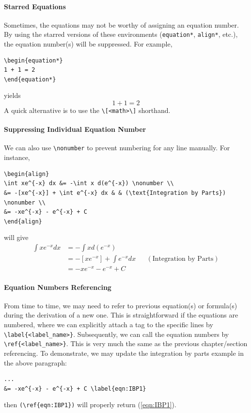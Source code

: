 \paragraph{Starred Equations}
Sometimes, the equations may not be worthy of assigning an equation number. By using the starred versions of these environments (\texttt{equation*}, \texttt{align*}, etc.), the equation number(s) will be suppressed. For example,
\begin{lstlisting}
\begin{equation*}
1 + 1 = 2
\end{equation*}
\end{lstlisting}
yields
\begin{equation*}
1 + 1 = 2
\end{equation*}
A quick alternative is to use the \verb|\[<math>\]|\index{\texttt{\textbackslash[\textbackslash]}} shorthand.

\paragraph{Suppressing Individual Equation Number}
We can also use \texttt{\textbackslash nonumber} to prevent numbering for any line manually. For instance,
\begin{lstlisting}
\begin{align}
\int xe^{-x} dx &= -\int x d(e^{-x}) \nonumber \\
&= -[xe^{-x}] + \int e^{-x} dx & & (\text{Integration by Parts}) \nonumber \\
&= -xe^{-x} - e^{-x} + C 
\end{align}
\end{lstlisting}
will give
\begin{align}
\int xe^{-x} dx &= -\int x d(e^{-x}) \nonumber \\
&= -[xe^{-x}] + \int e^{-x} dx & & (\text{Integration by Parts}) \nonumber \\
&= -xe^{-x} - e^{-x} + C \label{eqn:IBP1}
\end{align}

\paragraph{Equation Numbers Referencing}
From time to time, we may need to refer to previous equation(s) or formula(s) during the derivation of a new one. This is straightforward if the equations are numbered, where we can explicitly attach a tag to the specific lines by \texttt{\textbackslash label\{<label\_name>\}}. Subsequently, we can call the equation numbers by \texttt{\textbackslash ref\{<label\_name>\}}. This is very much the same as the previous chapter/section referencing. To demonstrate, we may update the integration by parts example in the above paragraph:
\begin{lstlisting}
...
&= -xe^{-x} - e^{-x} + C \label{eqn:IBP1}
\end{lstlisting}
then \texttt{(\textbackslash ref\{eqn:IBP1\})} will properly return (\ref{eqn:IBP1}).

